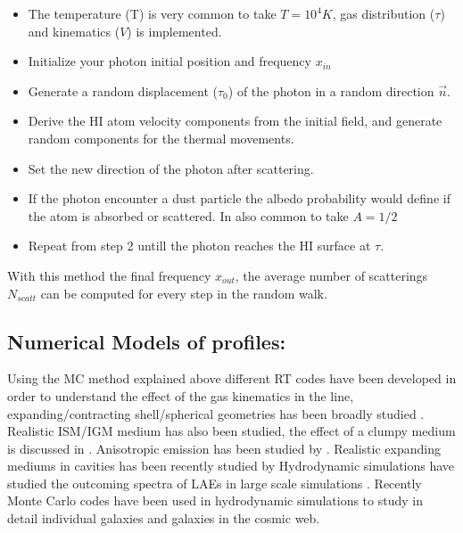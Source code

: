 \begin{itemize}
\item  The temperature (T) is very common to take $T=10^4K$, gas distribution ($\tau$) and kinematics ($V$) is implemented. 

\item Initialize your \ly photon initial position and frequency $x_{in}$

\item Generate a random displacement ($\tau_0$) of the photon in a random 
direction {\bf{$\vec{n}$}}.

\item  Derive the HI atom velocity components from the initial field, 
and generate random components for the thermal movements.

\item  Set the new direction of the \ly photon after scattering.

\item If the \ly photon encounter a dust particle the albedo probability 
would define if the atom is absorbed or scattered. In also common to take $A=1/2$

\item Repeat from step 2 untill the photon reaches the HI surface at $\tau$.  

\end{itemize}

With this method the final frequency $x_{out}$, the average number of scatterings $N_{scatt}$ can be computed for every step in the random walk.


\subsection{Numerical Models of \ly profiles:}

Using the MC method explained above different RT  codes 
\citep{DijkstraKramer, Laursen09, Verhamme06, CLARA}
have been developed in order to understand the effect of the gas kinematics in
the \lya line, expanding/contracting shell/spherical geometries
has been broadly studied \citep{Ahn03,Verhamme06,Dijkstra06}.
Realistic ISM/IGM medium has also been studied, the effect of a clumpy
medium is discussed in \citep{Hansen06}. Anisotropic \ly emission 
has been studied by \citep{Zheng2013}. Realistic expanding mediums 
in cavities has been recently studied by  \citep{Behrens2014} 
Hydrodynamic simulations have studied the outcoming spectra of
LAEs in large scale simulations \cite{Forero12}. 
Recently Monte Carlo codes have been used in hydrodynamic 
simulations to study in detail individual galaxies and galaxies 
in the cosmic web.
\citep{Laursen09,Barnes11,Verhamme12,Yajima12}

